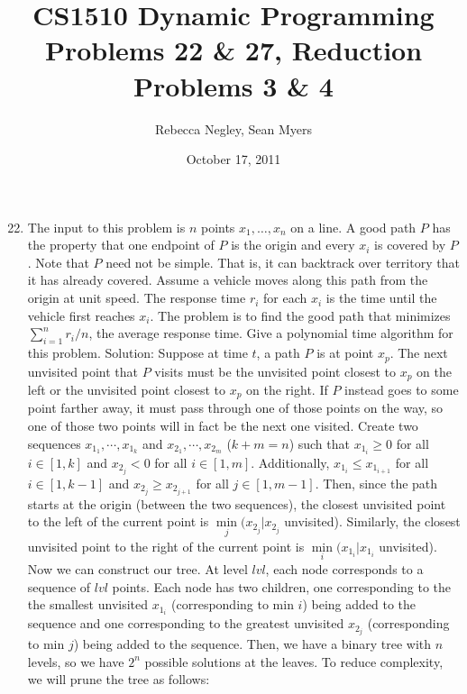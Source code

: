 \documentclass{article}
\title{CS1510  Dynamic Programming Problems 22 \& 27, Reduction Problems 3 \& 4}
\author{Rebecca Negley, Sean Myers}
\date{October 17, 2011}
\begin{document}
\maketitle

\begin{enumerate}
\setcounter{enumi}{21}
\item The input to this problem is $n$ points $x_1,\ldots ,x_n$ on a line. A good path $P$ has the property that one endpoint of $P$ is the origin and every $x_i$ is covered by $P$. Note that $P$ need not be simple. That is, it can backtrack over territory that it has already covered. Assume a vehicle moves along this path from the origin at unit speed. The response time $r_i$ for each $x_i$ is the time until the vehicle first reaches $x_i$. The problem is to find the good path that minimizes $\sum_{i=1}^{n} r_i/n$, the average response time. Give a polynomial time algorithm for this problem.
\newline
\newline Solution: Suppose at time $t$, a path $P$ is at point $x_p$. The next unvisited point that $P$ visits must be the unvisited point closest to $x_p$ on the left or the unvisited point closest to $x_p$ on the right. If $P$ instead goes to some point farther away, it must pass through one of those points on the way, so one of those two points will in fact be the next one visited.  Create two sequences $x_{1_1},\cdots ,x_{1_k}$ and $x_{2_1},\cdots ,x_{2_m}$ ($k+m=n$) such that $x_{1_i}\ge 0$ for all $i\in [1,k]$ and $x_{2_j}<0$ for all $i\in [1,m]$. Additionally, $x_{1_i}\le x_{1_{i+1}}$ for all $i\in [1,k-1]$ and $x_{2_j}\ge x_{2_{j+1}}$ for all $j\in [1,m-1]$. Then, since the path starts at the origin (between the two sequences), the closest unvisited point to the left of the current point is $\min\limits_{j} (x_{2_j} | x_{2_j}$ unvisited). Similarly, the closest unvisited point to the right of the current point is $\min\limits_{i} (x_{1_i} | x_{1_i}$ unvisited).
\newline
\newline Now we can construct our tree. At level $lvl$, each node corresponds to a sequence of $lvl$ points. Each node has two children, one corresponding to the the smallest unvisited $x_{1_i}$ (corresponding to min $i$) being added to the sequence and one corresponding to the greatest unvisited $x_{2_j}$ (corresponding to min $j$) being added to the sequence. Then, we have a binary tree with $n$ levels, so we have $2^n$ possible solutions at the leaves. To reduce complexity, we will prune the tree as follows:

\end{enumerate}
\end{document}
